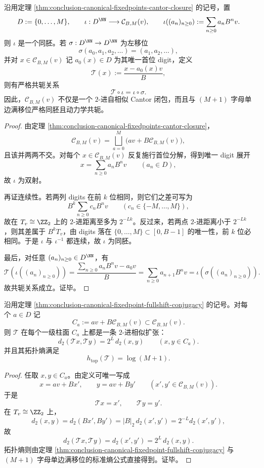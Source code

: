 \begin{theorem}[规范固定点闭包与单边满移位的严格共轭]\label{thm:conclusion-canonical-fixedpoint-fullshift-conjugacy}
沿用定理 \ref{thm:conclusion-canonical-fixedpoints-cantor-closure} 的记号，置
\[
D:=\{0,\dots,M\},
\qquad
\iota:D^{\NN}\longrightarrow \mathcal C_{B,M}(v),
\qquad
\iota((a_n)_{n\ge 0}):=\sum_{n\ge 0}a_nB^nv.
\]
则 \(\iota\) 是一个同胚。若 \(\sigma:D^{\NN}\to D^{\NN}\) 为左移位
\[
\sigma(a_0,a_1,a_2,\dots)=(a_1,a_2,\dots),
\]
并对 \(x\in \mathcal C_{B,M}(v)\) 记 \(a_0(x)\in D\) 为其唯一首位 digit，定义
\[
\mathcal T(x):=\frac{x-a_0(x)v}{B},
\]
则有严格共轭关系
\[
\mathcal T\circ \iota=\iota\circ \sigma.
\]
因此，\(\mathcal C_{B,M}(v)\) 不仅是一个 \(2\)-进自相似 Cantor 闭包，而且与 \((M+1)\) 字母单边满移位严格同胚且动力学共轭。
\end{theorem}
\begin{proof}
由定理 \ref{thm:conclusion-canonical-fixedpoints-cantor-closure}，
\[
\mathcal C_{B,M}(v)=\bigsqcup_{a=0}^{M}\bigl(av+B\mathcal C_{B,M}(v)\bigr),
\]
且该并两两不交。对每个 \(x\in \mathcal C_{B,M}(v)\) 反复施行首位分解，得到唯一 digit 展开
\[
x=\sum_{n\ge 0}a_nB^nv
\qquad (a_n\in D),
\]
故 \(\iota\) 为双射。

再证连续性。若两列 digits 在前 \(k\) 位相同，则它们之差可写为
\[
B^k\sum_{n\ge 0}c_nB^nv
\qquad (c_n\in\{-M,\dots,M\}),
\]
故在 \(T_v\cong \ZZ_2\) 上的 \(2\)-进距离至多为 \(2^{-Lk}\)。反过来，若两点 \(2\)-进距离小于 \(2^{-Lk}\)，则其差属于 \(B^kT_v\)，由 digits 落在 \(\{0,\dots,M\}\subset [0,B-1]\) 的唯一性，前 \(k\) 位必相同。于是 \(\iota\) 与 \(\iota^{-1}\) 都连续，故 \(\iota\) 为同胚。

最后，对任意 \((a_n)_{n\ge 0}\in D^{\NN}\)，有
\[
\mathcal T(\iota((a_n)_{n\ge 0}))
=
\frac{\sum_{n\ge 0}a_nB^nv-a_0v}{B}
=
\sum_{n\ge 0}a_{n+1}B^nv
=
\iota(\sigma((a_n)_{n\ge 0})).
\]
故共轭关系成立。证毕。
\end{proof}

\begin{corollary}\label{cor:conclusion-canonical-fixedpoint-exact-expanding-entropy}
沿用定理 \ref{thm:conclusion-canonical-fixedpoint-fullshift-conjugacy} 的记号。对每个 \(a\in D\) 记
\[
C_a:=av+B\mathcal C_{B,M}(v)\subset \mathcal C_{B,M}(v).
\]
则 \(\mathcal T\) 在每个一级柱面 \(C_a\) 上都是一条 \(2\)-进相似扩张：
\[
d_2(\mathcal T x,\mathcal T y)=2^L\,d_2(x,y)
\qquad (x,y\in C_a).
\]
并且其拓扑熵满足
\[
h_{\mathrm{top}}(\mathcal T)=\log(M+1).
\]
\end{corollary}
\begin{proof}
任取 \(x,y\in C_a\)。由定义可唯一写成
\[
x=av+Bx',
\qquad
y=av+By'
\qquad (x',y'\in \mathcal C_{B,M}(v)).
\]
于是
\[
\mathcal T x=x',
\qquad
\mathcal T y=y'.
\]
在 \(T_v\cong \ZZ_2\) 上，
\[
d_2(x,y)=d_2(Bx',By')=|B|_2\,d_2(x',y')=2^{-L}d_2(x',y'),
\]
故
\[
d_2(\mathcal T x,\mathcal T y)=d_2(x',y')=2^L\,d_2(x,y).
\]
拓扑熵则由定理 \ref{thm:conclusion-canonical-fixedpoint-fullshift-conjugacy} 与 \((M+1)\) 字母单边满移位的标准熵公式直接得到。证毕。
\end{proof}

